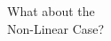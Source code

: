 \documentclass[aspectratio=169,14pt]{beamer}
\begin{document}



  




  
  


  
  \begin{frame}

    \begin{center}
      \textcolor{beamer@blendedblue}{
        \huge What about the\\[0.5em]
        \huge Non-Linear Case?
      }

      
    \end{center}

  \end{frame}
\end{document}
